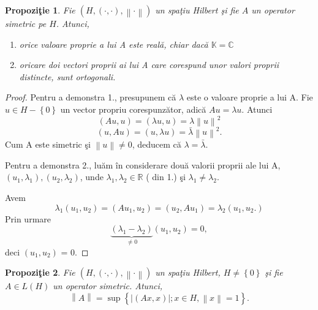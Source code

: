 \documentclass[a4paper,12pt,oneside]{report}
\newtheorem{proposition}{Propozi\c tie}
\begin{document}
\begin{proposition}
Fie \(\left ( H, \left ( \cdot ,\cdot  \right ), \left \| \cdot  \right \| \right )\)  un spa\c{t}iu Hilbert \c{s}i fie $A$ un operator simetric pe $H$. Atunci,
\begin{enumerate}
    \item orice valoare proprie a lui A este real\u{a}, chiar dac\u{a} \(\mathbb{K}=\mathbb{C}\)
    \item oricare doi vectori proprii ai lui A care corespund unor valori proprii distincte, sunt ortogonali.
\end{enumerate}
\end{proposition}
\begin{proof}
Pentru a demonstra 1., presupunem c\u{a} \( \lambda \) este o valoare proprie a lui A. Fie \(u \in H - \left \{ 0 \right \}\)  un vector propriu corespunz\u{a}tor, adic\u{a} \(Au = \lambda u\). Atunci
\begin{displaymath}
  \left ( Au, u  \right ) = \left ( \lambda u, u  \right ) = \lambda \left \| u \right \|^{2}
\end{displaymath}
\begin{displaymath}
  \left ( u, Au  \right ) = \left ( u, \lambda u  \right ) = \bar{\lambda} \left \| u \right \|^{2}.
\end{displaymath}
Cum A este simetric \c{s}i \(\left \| u \right \| \neq 0\), deducem c\u{a} \(\lambda  = \bar{\lambda }\).

\noindent Pentru a demonstra 2., lu\u{a}m \^{i}n considerare dou\u{a} valorii proprii ale lui A, \(\left ( u_{1}, \lambda _{1}\right ), \left ( u_{2} , \lambda _{2}\right )\), unde \(\lambda _{1},\lambda _{2} \in \mathbb{R}\) ( din 1.) \c{s}i \(\lambda _{1}\neq \lambda _{2} \).

Avem
\begin{displaymath}
  \lambda _{1}\left ( u_{1},u_{2} \right ) = \left ( Au_{1}, u_{2} \right ) = \left ( u_{2}, Au_{1} \right ) = \lambda _{2}\left ( u_{1}, u_{2}. \right )
\end{displaymath}
Prin urmare
\begin{displaymath}
  \underbrace{\left ( \lambda _{1} - \lambda _{2} \right )}_{\neq 0}\left ( u_{1}, u_{2} \right ) = 0,
\end{displaymath}
deci \(\left ( u_{1}, u_{2} \right ) \) = 0.
\end{proof}
\begin{proposition}
Fie \(\left ( H, \left ( \cdot ,\cdot  \right ), \left \| \cdot  \right \| \right )\) un spa\c{t}iu Hilbert, \(H \neq \left \{ 0 \right \}\)  \c{s}i fie \(A \in L\left ( H \right )\) un operator simetric. Atunci,
\begin{displaymath}
  \left \| A \right \| = \sup \left \{ \left | \left ( Ax,x \right ) \right |;x \in H, \left \| x \right \| =1\right \}.
\end{displaymath}
\end{proposition}
\end{document}
